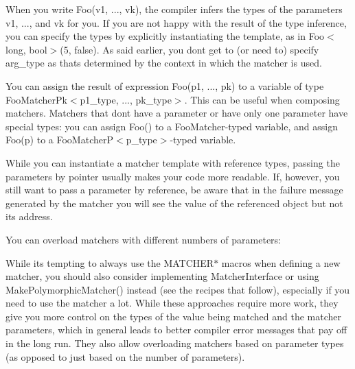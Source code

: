 When you write {\ttfamily Foo(v1, ..., vk)}, the compiler infers the types of the parameters {\ttfamily v1}, ..., and {\ttfamily vk} for you. If you are not happy with the result of the type inference, you can specify the types by explicitly instantiating the template, as in {\ttfamily Foo$<$long, bool$>$(5, false)}. As said earlier, you don\textquotesingle{}t get to (or need to) specify {\ttfamily arg\+\_\+type} as that\textquotesingle{}s determined by the context in which the matcher is used.

You can assign the result of expression {\ttfamily Foo(p1, ..., pk)} to a variable of type {\ttfamily Foo\+Matcher\+Pk$<$p1\+\_\+type, ..., pk\+\_\+type$>$}. This can be useful when composing matchers. Matchers that don\textquotesingle{}t have a parameter or have only one parameter have special types\+: you can assign {\ttfamily Foo()} to a {\ttfamily Foo\+Matcher}-\/typed variable, and assign {\ttfamily Foo(p)} to a {\ttfamily Foo\+MatcherP$<$p\+\_\+type$>$}-\/typed variable.

While you can instantiate a matcher template with reference types, passing the parameters by pointer usually makes your code more readable. If, however, you still want to pass a parameter by reference, be aware that in the failure message generated by the matcher you will see the value of the referenced object but not its address.

You can overload matchers with different numbers of parameters\+: 
\begin{DoxyCode}{0}
\end{DoxyCode}


While it\textquotesingle{}s tempting to always use the {\ttfamily M\+A\+T\+C\+H\+E\+R$\ast$} macros when defining a new matcher, you should also consider implementing {\ttfamily Matcher\+Interface} or using {\ttfamily Make\+Polymorphic\+Matcher()} instead (see the recipes that follow), especially if you need to use the matcher a lot. While these approaches require more work, they give you more control on the types of the value being matched and the matcher parameters, which in general leads to better compiler error messages that pay off in the long run. They also allow overloading matchers based on parameter types (as opposed to just based on the number of parameters).

